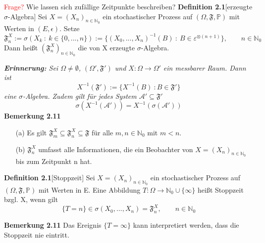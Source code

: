 \noindent
\textcolor{red}{Frage?} Wie lassen sich zufällige Zeitpunkte beschreiben?
\textbf{Definition 2.1}[erzeugte $\sigma$-Algebra]
Sei $X=(X_{n})_{n \in \mathbb{N}_{0}}$ ein stochastischer Prozess auf $(\Omega,\mathfrak{F},\mathbb{P})$ mit Werten in $(E,\epsilon)$. Setze
\begin{equation*}
\mathfrak{F}_{n}^{X} := \sigma(X_{k} \: : \: k \in \lbrace 0,...,n \rbrace) := \lbrace (X_{0},...,X_{n})^{-1}(B) \: : \: B \in  \varepsilon^{ \otimes (n+1)} \rbrace, \qquad n \in \mathbb{N}_{0} 
\end{equation*}
Dann heißt $(\mathfrak{F}_{n}^{X})_{n \in \mathbb{N}_{0}}$ die von X erzeugte $\sigma$-Algebra.

\noindent
\textit{\textbf{Erinnerung:} Sei $\Omega \neq \emptyset$, $(\Omega', \mathfrak{F}')$ und $X: \Omega \to \Omega'$ ein messbarer Raum. Dann ist
\begin{equation*}
X^{-1}(\mathfrak{F}') := \lbrace X^{-1}(B) \: : B \in \mathfrak{F}' \rbrace
\end{equation*}
eine $\sigma$-Algebra. Zudem gilt für jedes System $\mathcal{A}' \subseteq \mathfrak{F}'$
\begin{equation*}
\sigma(X^{-1}(\mathcal{A}')) = X^{-1}(\sigma(\mathcal{A}'))
\end{equation*}
}
\textbf{Bemerkung 2.11}
\mbox{}
\begin{itemize}
\item[(a)]Es gilt $\mathfrak{F}_{m}^{X} \subseteq \mathfrak{F}_{n}^{X} \subseteq \mathfrak{F}$ für alle $m,n \in \mathbb{N}_{0}$ mit $m<n$.
\item[(b)]$\mathfrak{F}_{n}^{X}$ umfasst alle Informationen, die ein Beobachter von $X=(X_{n})_{n \in \mathbb{N}_{0}}$ bis zum Zeitpunkt n hat. 
\end{itemize}

\textbf{Definition 2.1}[Stoppzeit]
Sei $X= (X_{n})_{n \in \mathbb{N}_{0}}$ ein stochastischer Prozess auf $(\Omega,\mathfrak{F},\mathbb{P})$ mit Werten in E. Eine Abbildung $T: \Omega \to \mathbb{N}_{0} \cup \lbrace \infty \rbrace $ heißt Stoppzeit bzgl. X, wenn gilt
\begin{equation*}
\lbrace T = n \rbrace \in \sigma(X_{0},...,X_{n}) = \mathfrak{F}_{n}^{X}, \qquad n \in \mathbb{N}_{0}
\end{equation*}

\textbf{Bemerkung 2.11}
Das Ereignis $\lbrace T = \infty \rbrace$ kann interpretiert werden, dass die Stoppzeit nie eintritt.  

